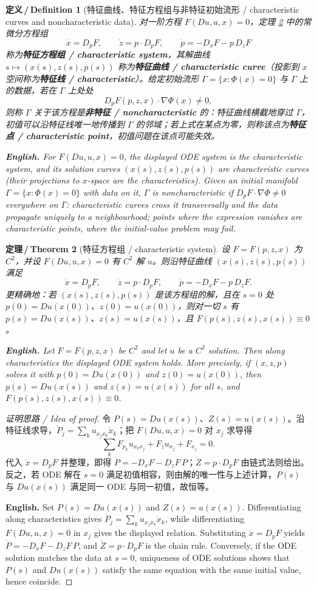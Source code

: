 \documentclass[UTF8,11pt,a4paper]{ctexart}
\newcommand{\EN}[1]{\par\noindent \textbf{English.} #1\par}
\newtheorem{definition}{定义\,/\,Definition}[section]
\newtheorem{theorem}[definition]{定理\,/\,Theorem}
\begin{document}
\begin{definition}[特征曲线、特征方程组与非特征初始流形 / characteristic curves and noncharacteristic data]\label{def:char}
对一阶方程 $F(Du,u,x)=0$，定理 \ref{thm:char} 中的常微分方程组
\[
\dot x=D_pF,\qquad \dot z=p\cdot D_pF,\qquad \dot p=-D_xF-p\,D_zF
\]
称为\textbf{特征方程组 / characteristic system}，其解曲线 $s\mapsto(x(s),z(s),p(s))$ 称为\textbf{特征曲线 / characteristic curve}（投影到 $x$ 空间称为\textbf{特征线 / characteristic}）。给定初始流形 $\Gamma=\{x:\Phi(x)=0\}$ 与 $\Gamma$ 上的数据，若在 $\Gamma$ 上处处
\[
D_pF(p,z,x)\cdot\nabla\Phi(x)\ne0,
\]
则称 $\Gamma$ 关于该方程是\textbf{非特征 / noncharacteristic} 的：特征曲线横截地穿过 $\Gamma$，初值可以沿特征线唯一地传播到 $\Gamma$ 的邻域；若上式在某点为零，则称该点为\textbf{特征点 / characteristic point}，初值问题在该点可能失效。
\EN{For $F(Du,u,x)=0$, the displayed ODE system is the characteristic system, and its solution curves $(x(s),z(s),p(s))$ are characteristic curves (their projections to $x$-space are the characteristics). Given an initial manifold $\Gamma=\{x:\Phi(x)=0\}$ with data on it, $\Gamma$ is noncharacteristic if $D_pF\cdot\nabla\Phi\ne0$ everywhere on $\Gamma$: characteristic curves cross it transversally and the data propagate uniquely to a neighbourhood; points where the expression vanishes are characteristic points, where the initial-value problem may fail.}
\end{definition}

\begin{theorem}[特征方程组 / characteristic system]\label{thm:char}
设 $F=F(p,z,x)$ 为 $C^2$，并设 $F(Du,u,x)=0$ 有 $C^2$ 解 $u$。则沿特征曲线 $(x(s),z(s),p(s))$ 满足
\[
\dot x=D_pF,\qquad \dot z=p\cdot D_pF,\qquad \dot p=-D_xF-p\,D_zF .
\]
更精确地：若 $(x(s),z(s),p(s))$ 是该方程组的解，且在 $s=0$ 处 $p(0)=Du(x(0))$、$z(0)=u(x(0))$，则对一切 $s$ 有 $p(s)=Du(x(s))$、$z(s)=u(x(s))$，且 $F(p(s),z(s),x(s))\equiv0$。
\EN{Let $F=F(p,z,x)$ be $C^2$ and let $u$ be a $C^2$ solution. Then along characteristics the displayed ODE system holds. More precisely, if $(x,z,p)$ solves it with $p(0)=Du(x(0))$ and $z(0)=u(x(0))$, then $p(s)=Du(x(s))$ and $z(s)=u(x(s))$ for all $s$, and $F(p(s),z(s),x(s))\equiv0$.}
\end{theorem}

\begin{proof}[证明思路 / Idea of proof]
令 $P(s)=Du(x(s))$、$Z(s)=u(x(s))$。沿特征线求导，$\dot P_j=\sum_k u_{x_jx_k}\dot x_k$；把 $F(Du,u,x)=0$ 对 $x_j$ 求导得
\[
\sum_k F_{p_k}u_{x_kx_j}+F_zu_{x_j}+F_{x_j}=0 .
\]
代入 $\dot x=D_pF$ 并整理，即得 $\dot P=-D_xF-D_zF\,P$；$\dot Z=p\cdot D_pF$ 由链式法则给出。反之，若 ODE 解在 $s=0$ 满足初值相容，则由解的唯一性与上述计算，$P(s)$ 与 $Du(x(s))$ 满足同一 ODE 与同一初值，故恒等。\EN{Set $P(s)=Du(x(s))$ and $Z(s)=u(x(s))$. Differentiating along characteristics gives $\dot P_j=\sum_k u_{x_jx_k}\dot x_k$, while differentiating $F(Du,u,x)=0$ in $x_j$ gives the displayed relation. Substituting $\dot x=D_pF$ yields $\dot P=-D_xF-D_zF\,P$, and $\dot Z=p\cdot D_pF$ is the chain rule. Conversely, if the ODE solution matches the data at $s=0$, uniqueness of ODE solutions shows that $P(s)$ and $Du(x(s))$ satisfy the same equation with the same initial value, hence coincide.}
\end{proof}
\end{document}
